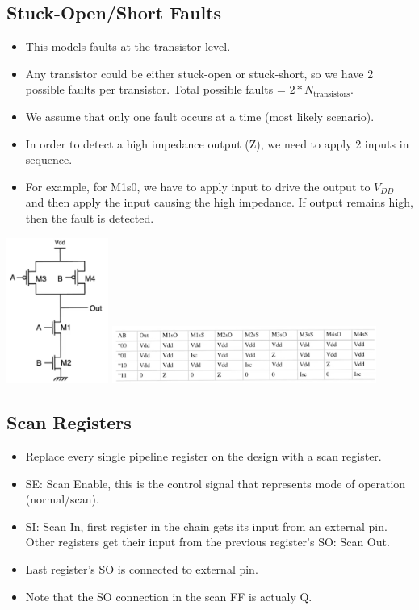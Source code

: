 \documentclass[11pt]{article}
\begin{document}
\subsection*{Stuck-Open/Short Faults}
\begin{itemize}
    \item This models faults at the transistor level.
    \item Any transistor could be either stuck-open or stuck-short, so we have 2 possible faults per transistor. Total possible faults = $2*{N_{\text{transistors}}}$.
    \item We assume that only one fault occurs at a time (most likely scenario).
    \item In order to detect a high impedance output (Z), we need to apply 2 inputs in sequence. 
    \item For example, for M1s0, we have to apply input to drive the output to $V_{DD}$ and then apply the input causing the high impedance. If output remains high, then the fault is detected.
\end{itemize}
\begin{center}
    \includegraphics[width=0.25\textwidth]{4.png}
    \includegraphics[width=0.65\textwidth]{5.png}
\end{center}

\subsection*{Scan Registers}
\begin{itemize}
    \item Replace every single pipeline register on the design with a scan register.
    \item SE: Scan Enable, this is the control signal that represents mode of operation (normal/scan).
    \item SI: Scan In, first register in the chain gets its input from an external pin. Other registers get their input from the previous register's SO: Scan Out.
    \item Last register's SO is connected to external pin.
    \item Note that the SO connection in the scan FF is actualy Q.
\end{itemize}
\end{document}
